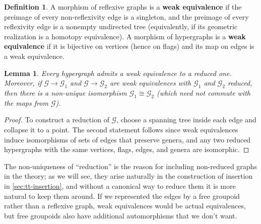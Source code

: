 \documentclass{article}
\newtheorem{lem}[thm]{Lemma}
\theoremstyle{definition}
\newtheorem{defn}[thm]{Definition}
\theoremstyle{remark}
\def\G{\mathcal{G}}
\begin{document}
\begin{defn}\label{defn:weq}
  A morphism of reflexive graphs is a \textbf{weak equivalence} if the preimage of every non-reflexivity edge is a singleton, and the preimage of every reflexivity edge is a nonempty undirected tree (equivalently, if its geometric realization is a homotopy equivalence).
  A morphism of hypergraphs is a \textbf{weak equivalence} if it is bijective on vertices (hence on flags) and its map on edges is a weak equivalence.
\end{defn}

\begin{lem}\label{thm:reduction}
  Every hypergraph admits a weak equivalence to a reduced one.
  Moreover, if $\G\to \G_1$ and $\G \to \G_2$ are weak equivalences with $\G_1$ and $\G_2$ reduced, then there is a non-unique isomorphism $\G_1 \cong \G_2$ (which need not commute with the maps from $\G$).
\end{lem}
\begin{proof}
  To construct a reduction of $\G$, choose a spanning tree inside each edge and collapse it to a point.
  The second statement follows since weak equivalences induce isomorphisms of sets of edges that preserve genera, and any two reduced hypergraphs with the same vertices, flags, edges, and genera are isomorphic.
\end{proof}

The non-uniqueness of ``reduction'' is the reason for including non-reduced graphs in the theory; as we will see, they arise naturally in the construction of insertion in \cref{sec:tt-insertion}, and without a canonical way to reduce them it is more natural to keep them around.
If we represented the edges by a free groupoid rather than a reflexive graph, weak equivalences would be actual equivalences, but free groupoids also have additional automorphisms that we don't want.


\end{document}

